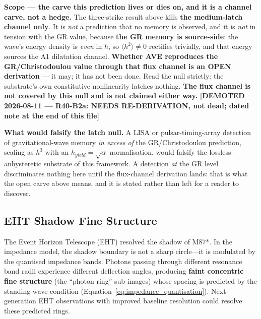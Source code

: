 \noindent\textbf{Scope --- the carve this prediction lives or dies on, and it is a channel carve, not a hedge.} The three-strike result above kills \textbf{the medium-latch channel only}. It is \emph{not} a prediction that no memory is observed, and it is \emph{not} in tension with the GR value, because \textbf{the GR memory is source-side}: the wave's energy density is \emph{even} in $h$, so $\langle h^2\rangle \neq 0$ rectifies trivially, and that energy sources the A1 dilatation channel. \textbf{Whether AVE reproduces the GR/Christodoulou value through that flux channel is an OPEN derivation} --- it may; it has not been done. Read the null strictly: the substrate's own constitutive nonlinearity latches nothing. \textbf{The flux channel is not covered by this null and is not claimed either way.} \textbf{[DEMOTED 2026-08-11 --- R40-B2a: NEEDS RE-DERIVATION, not dead; dated note at the end of this file]}

\noindent\textbf{What would falsify the latch null.} A LISA or pulsar-timing-array detection of gravitational-wave memory \emph{in excess of} the GR/Christodoulou prediction, scaling as $h^3$ with an $h_{yield} = \sqrt{\alpha}$ normalisation, would falsify the lossless-anhysteretic substrate of this framework. A detection \emph{at} the GR level discriminates nothing here until the flux-channel derivation lands: that is what the open carve above means, and it is stated rather than left for a reader to discover.

\subsection{EHT Shadow Fine Structure}

The Event Horizon Telescope (EHT) resolved the shadow of M87*. In the impedance model, the shadow boundary is not a sharp circle---it is modulated by the quantised impedance bands. Photons passing through different resonance band radii experience different deflection angles, producing \textbf{faint concentric fine structure} (the ``photon ring'' sub-images) whose spacing is predicted by the standing-wave condition (Equation~\ref{eq:impedance_quantisation}). Next-generation EHT observations with improved baseline resolution could resolve these predicted rings.

